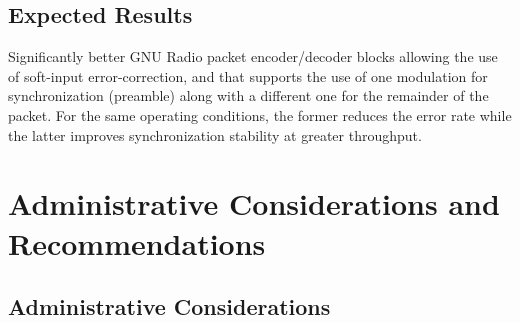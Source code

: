 \documentclass[12pt,english]{TCLsem}
\begin{document}
\subsection{Expected Results}
Significantly better GNU Radio packet encoder/decoder blocks allowing the use of soft-input error-correction, and that supports the use of one modulation for synchronization (preamble) along with a different one for the remainder of the packet. For the same operating conditions, the former reduces the error rate while the latter improves synchronization stability at greater throughput.

\section{Administrative Considerations and\\ Recommendations}

\subsection{Administrative Considerations}
\end{document}
